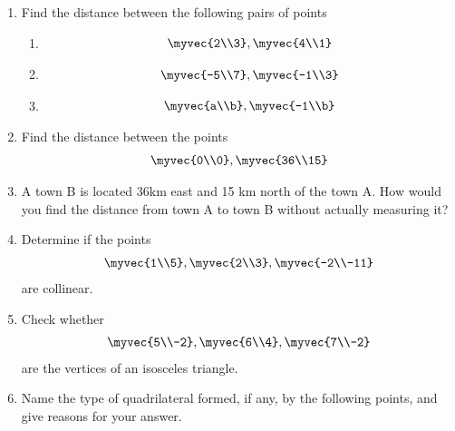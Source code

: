 \renewcommand{\theequation}{\theenumi}
\begin{enumerate}[label=\arabic*.,ref=\thesubsection.\theenumi]
\item Find the distance between the following pairs of points
\begin{enumerate}
\item 
\begin{align}
\myvec{2\\3}, \myvec{4\\1}
\end{align}
\item 
\begin{align}
\myvec{-5\\7}, \myvec{-1\\3}
\end{align}
\item 
\begin{align}
\myvec{a\\b}, \myvec{-1\\b}
\end{align}
\end{enumerate}
\item Find the distance between the points 
\begin{align}
\myvec{0\\0}, \myvec{36\\15}
\end{align}
%
\item A town B is located 36km east and 15 km north of the town A.  How would you find the distance from town A to town B without actually measuring it?
\item Determine if the points 
\begin{align}
\myvec{1\\5}, \myvec{2\\3}, \myvec{-2\\-11}
\end{align}
%
are collinear.	
\item Check whether 
\begin{align}
\myvec{5\\-2}, \myvec{6\\4}, \myvec{7\\-2}
\end{align}
are the vertices of an isosceles triangle.
\item Name the type of quadrilateral formed, if any, by the following points, and give reasons for your answer.
\begin{enumerate}

\end{enumerate}
\end{enumerate}
